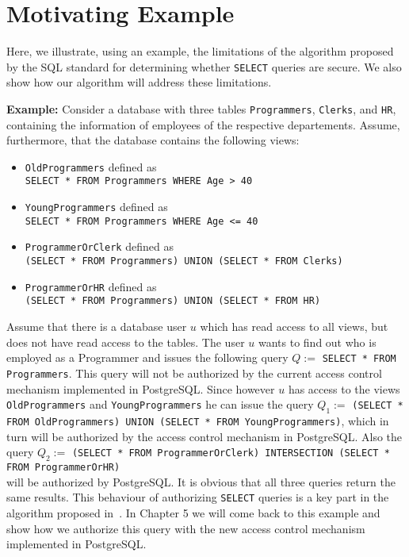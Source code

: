 \section{Motivating Example}

Here, we illustrate, using an example, the limitations of the algorithm proposed by the SQL standard for determining whether \texttt{SELECT} queries are secure.
%
We also show how our algorithm will address these limitations.


\smallskip
\noindent
{\bf Example:}
%
Consider a database with three tables \texttt{Programmers}, \texttt{Clerks}, and \texttt{HR}, containing the information of employees of the respective departements.
%
Assume, furthermore, that the database contains the following views:
\begin{itemize}
	\item \texttt{OldProgrammers} defined as \\ \texttt{SELECT * FROM Programmers WHERE Age > 40}
	\item \texttt{YoungProgrammers} defined as \\ \texttt{SELECT * FROM Programmers WHERE Age <= 40}
	\item \texttt{ProgrammerOrClerk} defined as \\ \texttt{(SELECT * FROM Programmers) UNION (SELECT * FROM Clerks)}
	\item \texttt{ProgrammerOrHR} defined as \\ \texttt{(SELECT * FROM Programmers) UNION (SELECT * FROM HR)}
\end{itemize}
%
Assume that there is a database user $u$ which has read access to all views, but does not have read access to the tables.
%
The user $u$ wants to find out who is employed as a Programmer and issues the following query $Q := $ \texttt{SELECT * FROM Programmers}. 
%
This query will not be authorized by the current access control mechanism implemented in PostgreSQL.
%
Since however $u$ has access to the views \texttt{OldProgrammers} and \texttt{YoungProgrammers} he can issue the query $Q_1 := $ \texttt{(SELECT * FROM OldProgrammers) UNION (SELECT * FROM YoungProgrammers)}, which in turn will be authorized by the access control mechanism in PostgreSQL.
%
Also the query $Q_2 := $ \texttt{(SELECT * FROM ProgrammerOrClerk) INTERSECTION (SELECT * FROM ProgrammerOrHR)} \\ will be authorized by PostgreSQL.
%
It is obvious that all three queries return the same results.
%
This behaviour of authorizing \texttt{SELECT} queries is a key part in the algorithm proposed in~\cite{guarnieri2016strong}.
%
In Chapter 5 we will come back to this example and show how we authorize this query with the new access control mechanism implemented in PostgreSQL.
